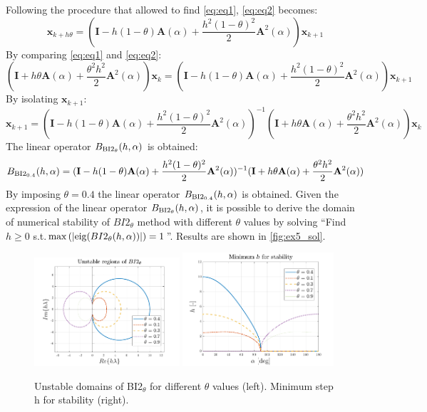 \documentclass[11pt,a4paper,oneside]{article}
\renewcommand{\vec}[1]{\mathbf{#1}}
\begin{document}
Following the procedure that allowed to find \autoref{eq:eq1}, \autoref{eq:eq2} becomes:
\begin{equation}
    \vec{x}_{k+h\theta} = (\vec{I} - h(1-\theta)\vec{A}(\alpha) + \frac{h^2(1-\theta)^2}{2}\vec{A}^2(\alpha))\vec{x}_{k+1}
\end{equation}
By comparing \autoref{eq:eq1} and \autoref{eq:eq2}:
\begin{equation}
    (\vec{I} + h\theta\vec{A}(\alpha) + \frac{\theta^2h^2}{2}\vec{A}^2(\alpha))\vec{x}_k = (\vec{I} - h(1-\theta)\vec{A}(\alpha) + \frac{h^2(1-\theta)^2}{2}\vec{A}^2(\alpha))\vec{x}_{k+1}
\end{equation}
By isolating $\vec{x}_{k+1}$:
\begin{equation}
    \vec{x}_{k+1} = (\vec{I} - h(1-\theta)\vec{A}(\alpha) + \frac{h^2(1-\theta)^2}{2}\vec{A}^2(\alpha))^{-1}(\vec{I} + h\theta\vec{A}(\alpha) + \frac{\theta^2h^2}{2}\vec{A}^2(\alpha))\vec{x}_k
\end{equation}
The linear operator $B_{\rm BI2_{\theta}}(h,\alpha)$ is obtained:
\begin{equation}
    B_{\rm BI2_{0.4}}(h,\alpha) = (\vec{I} - h(1-\theta)\vec{A}(\alpha) + \frac{h^2(1-\theta)^2}{2}\vec{A}^2(\alpha))^{-1}(\vec{I} + h\theta\vec{A}(\alpha) + \frac{\theta^2h^2}{2}\vec{A}^2(\alpha))
\end{equation}
By imposing $\theta = 0.4$ the linear operator $B_{\rm BI2_{0.4}}(h,\alpha)$ is obtained.
Given the expression of the linear operator $B_{\rm BI2_{\theta}}(h,\alpha)$, it is possible to derive the domain of numerical stability of $BI2_{\theta}$ method with different $\theta$ values by solving ``Find $h\ge 0$ s.t.$\max\left(|{\rm eig}(BI2_{\theta}(h,\alpha))|\right) = 1$''. Results are shown in \autoref{fig:ex5_sol}.

\begin{figure}[h]
    \centering
    \includegraphics[width=0.48\textwidth]{gfx/ex5_1.pdf}
    \includegraphics[width=0.50\textwidth]{gfx/ex5_2.pdf}
    \caption{Unstable domains of BI2$_{\theta}$ for different $\theta$ values (left). Minimum step h for stability (right).}
    \label{fig:ex5_sol}
\end{figure}
\end{document}
